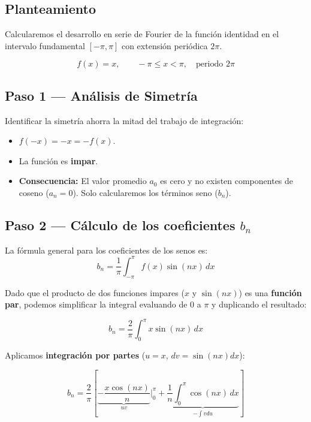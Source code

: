 \documentclass[
  letterpaper,
  DIV=11,
  numbers=noendperiod]{scrreprt}
\providecommand{\tightlist}{%
  \setlength{\itemsep}{0pt}\setlength{\parskip}{0pt}}
\begin{document}
\subsection{Planteamiento}\label{planteamiento-4}

Calcularemos el desarrollo en serie de Fourier de la función identidad
en el intervalo fundamental \([-\pi, \pi]\) con extensión periódica
\(2\pi\).

\[
f(x) = x, \qquad -\pi \le x < \pi, \quad \text{periodo } 2\pi
\]

\subsection{Paso 1 --- Análisis de
Simetría}\label{paso-1-anuxe1lisis-de-simetruxeda}

Identificar la simetría ahorra la mitad del trabajo de integración:

\begin{itemize}
\tightlist
\item
  \(f(-x) = -x = -f(x)\).
\item
  La función es \textbf{impar}.
\item
  \textbf{Consecuencia:} El valor promedio \(a_0\) es cero y no existen
  componentes de coseno (\(a_n = 0\)). Solo calcularemos los términos
  seno (\(b_n\)).
\end{itemize}

\subsection{\texorpdfstring{Paso 2 --- Cálculo de los coeficientes
\(b_n\)}{Paso 2 --- Cálculo de los coeficientes b\_n}}\label{paso-2-cuxe1lculo-de-los-coeficientes-b_n}

La fórmula general para los coeficientes de los senos es:
\[b_n = \frac{1}{\pi}\int_{-\pi}^{\pi} f(x)\sin(nx)\,dx\]

Dado que el producto de dos funciones impares (\(x\) y \(\sin(nx)\)) es
una \textbf{función par}, podemos simplificar la integral evaluando de
\(0\) a \(\pi\) y duplicando el resultado:

\[b_n = \frac{2}{\pi}\int_{0}^{\pi} x\sin(nx)\,dx\]

Aplicamos \textbf{integración por partes} (\(u = x\),
\(dv = \sin(nx)dx\)):

\[
b_n = \frac{2}{\pi}\left[ \underbrace{-\frac{x\cos(nx)}{n}}_{uv} \Bigg|_0^\pi + \underbrace{\frac{1}{n}\int_0^\pi \cos(nx)\,dx}_{-\int v du} \right]
\]
\end{document}
